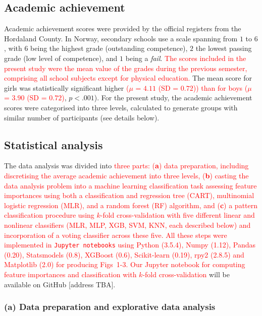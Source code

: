 \documentclass[10pt,letterpaper]{article}
\begin{document}
\subsection*{Academic achievement}
Academic achievement scores were provided by the official registers from the Hordaland County. In Norway, secondary schools use a scale spanning from $1$ to $6$, with $6$ 
being the highest grade (outstanding competence),  $2$  the lowest passing grade (low level of competence), and $1$ being a {\it fail}. 
\textcolor{red}{The scores included in the present study were the mean value of the grades during the previous semester, comprising all school subjects except for physical education. }
The mean score for girls was statistically significant higher  \textcolor{red}{($\mu$ = $4.11$ (SD = $0.72$)) than for boys {($\mu$ = $3.90$ (SD = $0.72$)}}, $p  <  .001$). 
For the present study, the academic achievement scores were categorised into three levels, calculated to generate groups with similar number of participants (see details below). 



\subsection*{Statistical analysis}
The data analysis was divided into \textcolor{red}{three parts: ({\bf  a}) data preparation, including discretising the average academic achievement into three levels,  ({\bf b}) casting the data analysis problem 
into a machine learning classification task assessing feature importances using both 
a classification and regression tree (CART), multinomial logistic regression (MLR), and a random forest (RF) algorithm, and ({\bf c}) a pattern 
classification procedure using $k$-fold cross-validation with five different linear and nonlinear classifiers (MLR, MLP, XGB, SVM, KNN, each described below) and incorporation of
a voting classifier across  these five.
All these steps were implemented in {\tt Jupyter notebooks}  using Python (3.5.4), Numpy (1.12), Pandas (0.20), Statsmodels (0.8),  XGBoost (0.6), Scikit-learn (0.19),  rpy2 (2.8.5)
and Matplotlib (2.0) for producing Figs~1-3. Our Jupyter notebook for computing feature importances and 
classification with $k$-fold cross-validation} will be available on GitHub [address TBA].  

\vspace{3mm}
\subsubsection*{(a) Data preparation and explorative data analysis}
\end{document}
